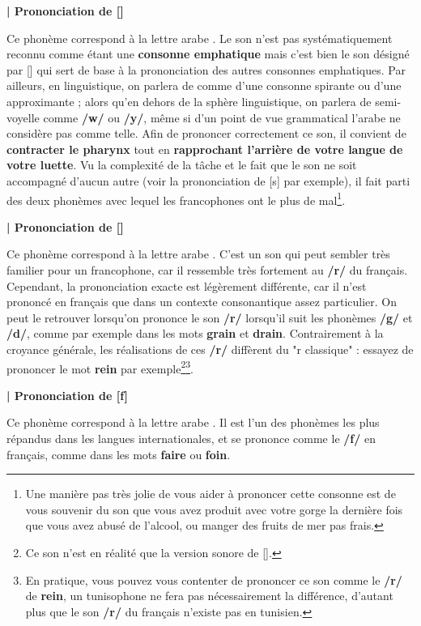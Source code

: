 \textbf{| Prononciation de  [\textrevglotstop]}

Ce phonème correspond à la lettre arabe . Le son n'est pas systématiquement reconnu comme étant une \textbf{consonne emphatique} mais c'est bien le son désigné par  [\textrevglotstop] qui sert de base à la prononciation des autres consonnes emphatiques. Par ailleurs, en linguistique, on parlera de  comme d'une consonne spirante ou d'une approximante ;  alors qu'en dehors de la sphère linguistique, on parlera de semi-voyelle comme \textbf{/w/} ou \textbf{/y/}, même si d'un point de vue grammatical l'arabe ne considère pas  comme telle. Afin de prononcer correctement ce son, il convient de \textbf{contracter le pharynx} tout en \textbf{rapprochant l'arrière de votre langue de votre luette}. Vu la complexité de la tâche et le fait que le son ne soit accompagné d'aucun autre (voir la prononciation de  [s\super \textrevglotstop] par exemple), il fait parti des deux phonèmes avec lequel les francophones ont le plus de mal\footnote{Une manière pas très jolie de vous aider à prononcer cette consonne est de vous souvenir du son que vous avez produit avec votre gorge la dernière fois que vous avez abusé de l'alcool, ou manger des fruits de mer pas frais.}.


\textbf{| Prononciation de  [\textinvscr]}

Ce phonème correspond à la lettre arabe . C'est un son qui peut sembler très familier pour un francophone, car il ressemble très fortement au \textbf{/r/} du français. Cependant, la prononciation exacte est légèrement différente, car il n'est prononcé en français que dans un contexte consonantique assez particulier. On peut le retrouver lorsqu'on prononce le son \textbf{/r/} lorsqu'il suit les phonèmes \textbf{/g/} et \textbf{/d/}, comme par exemple dans les mots \textbf{grain} et \textbf{drain}. Contrairement à la croyance générale, les réalisations de ces \textbf{/r/} diffèrent du "r classique" : essayez de prononcer le mot \textbf{rein} par exemple\footnote{Ce son n'est en réalité que la version sonore de  [\textchi].}\footnote{En pratique, vous pouvez vous contenter de prononcer ce son comme le \textbf{/r/} de \textbf{rein}, un tunisophone ne fera pas nécessairement la différence, d'autant plus que le son \textbf{/r/} du français n'existe pas en tunisien.}.

\textbf{| Prononciation de   [f]}

Ce phonème correspond à la lettre arabe . Il est l'un des phonèmes les plus répandus dans les langues internationales, et se prononce comme le \textbf{/f/} en français, comme dans les mots \textbf{faire} ou \textbf{foin}.



